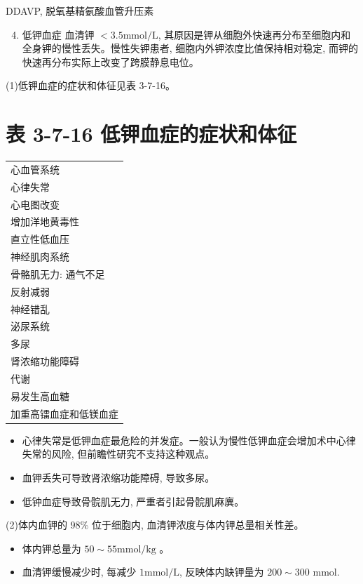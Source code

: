 \documentclass[10pt]{article}
\begin{document}
DDAVP, 脱氧基精氨酸血管升压素

\begin{enumerate}
  \setcounter{enumi}{3}
  \item 低钾血症 血清钾 $<3.5 \mathrm{mmol} / \mathrm{L}$, 其原因是钾从细胞外快速再分布至细胞内和全身钾的慢性丢失。慢性失钾患者, 细胞内外钾浓度比值保持相对稳定, 而钾的快速再分布实际上改变了跨膜静息电位。
\end{enumerate}

(1)低钾血症的症状和体征见表 3-7-16。

\section*{表 3-7-16 低钾血症的症状和体征}
\begin{center}
\begin{tabular}{l}
\hline
心血管系统 \\
心律失常 \\
心电图改变 \\
增加洋地黄毒性 \\
直立性低血压 \\
神经肌肉系统 \\
骨骼肌无力: 通气不足 \\
反射减弱 \\
神经错乱 \\
泌尿系统 \\
多尿 \\
肾浓缩功能障碍 \\
代谢 \\
易发生高血糖 \\
加重高镭血症和低镁血症 \\
\hline
\end{tabular}
\end{center}

\begin{itemize}
  \item 心律失常是低钾血症最危险的并发症。一般认为慢性低钾血症会增加术中心律失常的风险, 但前瞻性研究不支持这种观点。
  \item 血钾丢失可导致肾浓缩功能障碍, 导致多尿。
  \item 低钟血症导致骨䯘肌无力, 严重者引起骨䯘肌麻廙。
\end{itemize}

(2)体内血钾的 $98 \%$ 位于细胞内, 血清钾浓度与体内钾总量相关性差。

\begin{itemize}
  \item 体内钾总量为 $50 \sim 55 \mathrm{mmol} / \mathrm{kg}$ 。
  \item 血清钾缓慢减少时, 每减少 $1 \mathrm{mmol} / \mathrm{L}$, 反映体内缺钾量为 $200 \sim 300$ mmol.
\end{itemize}
\end{document}
